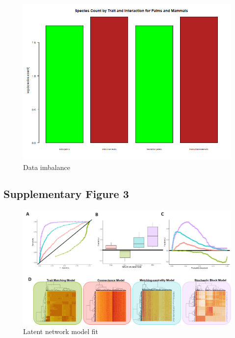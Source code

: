 \documentclass[
]{agujournal2019}
\begin{document}
\begin{figure}[H]

{\centering \includegraphics[width=5.67708in,height=\textheight,keepaspectratio]{sup_figures/species_count_plot_AAS_style.png}

}

\caption{Data imbalance}

\end{figure}%

\subsection{Supplementary Figure 3}

\begin{figure}[H]

{\centering \includegraphics[width=5.67708in,height=\textheight,keepaspectratio]{sup_figures/Sup_modelsfit.jpg}

}

\caption{Latent network model fit}

\end{figure}%
\end{document}
